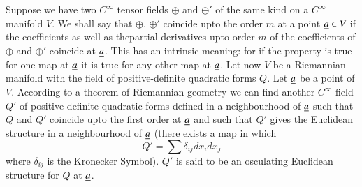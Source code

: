 Suppose we have two $C^{\infty}$ tensor fields $\oplus$ and $\oplus'$
of the same kind on a $C^{\infty}$ manifold $V$. We shall say that
$\oplus$, $\oplus'$ coincide upto the order $m$ at a point $\underline{a}\in
V$ if the coefficients as well as the\pageoriginale partial
derivatives upto order $m$ of the coefficients of $\oplus$ and
$\oplus'$ coincide at $\underline{a}$. This has an intrinsic meaning: for if
the property is true for one map at $\underline{a}$ it is true for any other
map at $\underline{a}$. Let now $V$ be a Riemannian manifold with the field
of positive-definite quadratic forms $Q$. Let $\underline{a}$ be a point of
$V$. According to a theorem of Riemannian geometry we can find another
$C^{\infty}$ field $Q'$ of positive definite quadratic forms defined
in a neighbourhood of $\underline{a}$ such that $Q$ and $Q'$ coincide upto
the first order at $\underline{a}$ and such that $Q'$ gives the Euclidean
structure in a neighbourhood of $\underline{a}$ (\iec there exists a map in
which
$$
Q'=\sum \delta_{ij}dx_{i}dx_{j}
$$
where $\delta_{ij}$ is the Kronecker Symbol). $Q'$ is said to be an
osculating Euclidean structure for $Q$ at $\underline{a}$.

